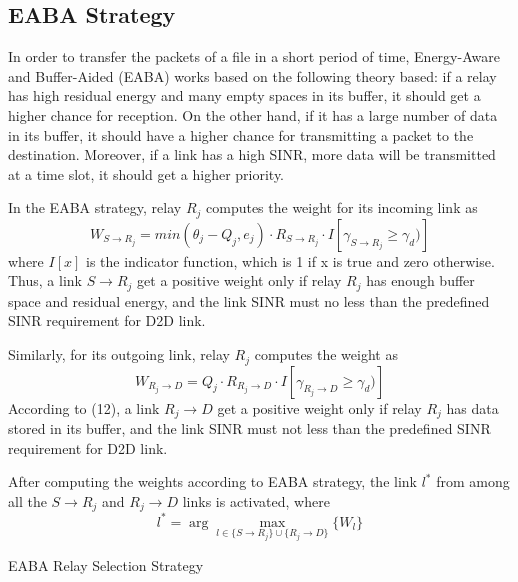 \documentclass[conference]{IEEEtran}
\begin{document}
\subsection{EABA Strategy}
In order to transfer the packets of a file in a short period of time, Energy-Aware and Buffer-Aided (EABA) works based on the following theory based: if a relay has high residual energy and many empty spaces in its buffer, it should get a higher chance for reception. On the other hand, if it has a large number of data in its buffer, it should have a higher chance for transmitting a packet to the destination. Moreover, if a link has a high SINR, more data will be transmitted at a time slot, it should get a higher priority.

In the EABA strategy, relay $R_j$ computes the weight for its incoming link as
\begin{equation}
W_{S\rightarrow R_j} = min(\theta_j - Q_j,e_j) \cdot R_{S\rightarrow R_j} \cdot I[\gamma_{S\rightarrow R_j} \geq \gamma_d)]
\end{equation}
where $I[x]$ is the indicator function, which is 1 if x is true and zero otherwise. Thus, a link $S \rightarrow R_j$ get a positive weight only if relay $R_j$ has enough buffer space and residual energy, and the link SINR must no less than the predefined SINR requirement for D2D link.

Similarly, for its outgoing link, relay $R_j$ computes the weight as
\begin{equation}
W_{R_j \rightarrow D} = Q_j \cdot R_{R_j \rightarrow D} \cdot I[\gamma_{R_j \rightarrow D} \geq \gamma_d)]
\end{equation}
According to (12), a link $R_j \rightarrow D$ get a positive weight only if relay $R_j$ has data stored in its buffer, and the link SINR must not less than the predefined SINR requirement for D2D link.

After computing the weights according to EABA strategy, the link $l^*$ from among all the $S \rightarrow R_j$ and $R_j \rightarrow D$ links is activated, where
\begin{equation}
l^* = \arg \max_{l \in \{S \rightarrow R_j\} \cup \{R_j \rightarrow D\}}\{W_l\}
\end{equation}

\begin{algorithm}[!t]
\caption{EABA Relay Selection Strategy}
\begin{algorithmic} [1]
\end{algorithmic}
\end{algorithm}
\end{document}

